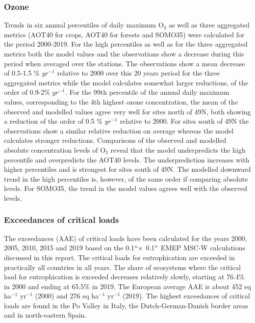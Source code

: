 \subsubsection*{Ozone}
Trends in six annual percentiles of daily maximum O$_3$ as well as three aggregated metrics (AOT40 for crops, AOT40 for forests and SOMO35) were calculated for the period 2000-2019. For the high percentiles as well as for the three aggregated metrics both the model values and the observations show a decrease during this period when averaged over the stations. The observations show a mean decrease of 0.5-1.5 \% $yr^{-1}$ relative to 2000 over this 20 years period for the three aggregated metrics while the model calculates somewhat larger reductions, of the order of 0.9-2\% $yr^{-1}$. For the 99th percentile of the annual daily maximum values, corresponding to the 4th highest ozone concentration, the mean of the observed and modelled values agree very well for sites north of 49\degrees N, both showing a reduction of the order of 0.5  \% $yr^{-1}$ relative to 2000. For sites south of 49\degrees N the observations show a similar relative reduction on average whereas the model calculates stronger reductions. Comparisons of the observed and modelled absolute concentration levels of O$_3$ reveal that the model underpredicts the high percentile and overpredicts the AOT40 levels. The underprediction increases with higher percentiles and is strongest for sites south of 49\degrees N. The modelled downward trend in the high percentiles is, however, of the same order if comparing absolute levels. For SOMO35, the trend in the model values agrees well with the observed levels.

\subsubsection*{Exceedances of critical loads}
The exceedances (AAE) of critical loads have been calculated for the years 2000, 2005, 2010, 2015 and 2019 based on the 0.1$^\circ \times$ 0.1$^\circ$ EMEP MSC-W calculations discussed in this report. The critical loads for eutrophication are exceeded in practically all countries in all years. The share of ecosystems where the critical load for eutrophication is exceeded decreases relatively slowly, starting at 76.4\% in 2000 and ending at 65.5\% in 2019. The European average AAE is about 452 eq ha$^{-1}$ yr$^{-1}$ (2000) and 276 eq
ha$^{-1}$ yr$^{-1}$ (2019). The highest exceedances of critical loads are found in the Po Valley in Italy, the
Dutch-German-Danish border areas and in north-eastern Spain.

